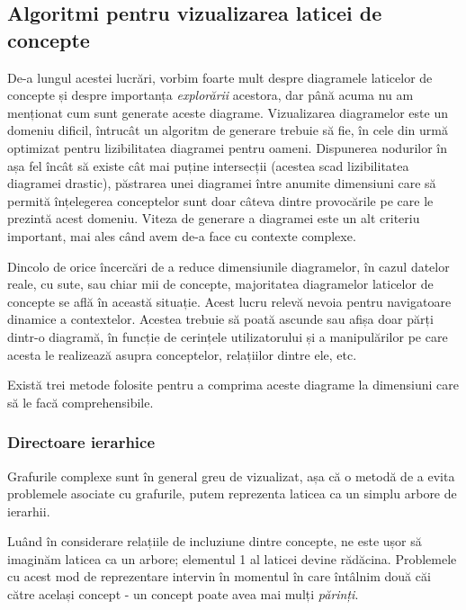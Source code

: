 \documentclass[12pt, a4paper, twoside, romanian]{teza-upb}
\begin{document}
    \subsection{Algoritmi pentru vizualizarea laticei de concepte}

      De-a lungul acestei lucrări, vorbim foarte mult despre diagramele laticelor de concepte și despre importanța \textit{explorării} acestora, dar până acuma nu am menționat cum sunt generate aceste diagrame. 
      Vizualizarea diagramelor este un domeniu dificil, întrucât un algoritm de generare trebuie să fie, în cele din urmă optimizat pentru lizibilitatea diagramei pentru oameni. Dispunerea nodurilor în așa fel încât să existe cât mai puține intersecții (acestea scad lizibilitatea diagramei drastic), păstrarea unei diagramei între anumite dimensiuni care să permită înțelegerea conceptelor sunt doar câteva dintre provocările pe care le prezintă acest domeniu.
      Viteza de generare a diagramei este un alt criteriu important, mai ales când avem de-a face cu contexte complexe.

      Dincolo de orice încercări de a reduce dimensiunile diagramelor, în cazul datelor reale, cu sute, sau chiar mii de concepte, majoritatea diagramelor laticelor de concepte se află în această situație. Acest lucru relevă nevoia pentru navigatoare dinamice a contextelor. Acestea trebuie să poată ascunde sau afișa doar părți dintr-o diagramă, în funcție de cerințele utilizatorului și a manipulărilor pe care acesta le realizează asupra conceptelor, relațiilor dintre ele, etc.

      Există trei metode folosite pentru a comprima aceste diagrame la dimensiuni care să le facă comprehensibile.

      \subsubsection{Directoare ierarhice}

        Grafurile complexe sunt în general greu de vizualizat, așa că o metodă de a evita problemele asociate cu grafurile, putem reprezenta laticea ca un simplu arbore de ierarhii.

        Luând în considerare relațiile de incluziune dintre concepte, ne este ușor să imaginăm laticea ca un arbore; elementul 1 al laticei devine rădăcina. Problemele cu acest mod de reprezentare intervin în momentul în care întâlnim două căi către același concept - un concept poate avea mai mulți \textit{părinți}.
        
\end{document}
